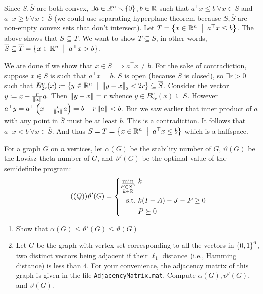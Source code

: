 Since $S,\overline S$ are both convex, $\exists a\in \mathbb{R}^{n}\smallsetminus\left\{0\right\}, b\in\mathbb{R}$ such that $a^{\top}x\le b~\forall x\in S$ and $a^{\top}x \ge b~\forall x\in \overline S$ (we could use separating hyperplane theorem because $S,\overline S$ are non-empty convex sets that don't intersect). Let $T = \set{x\in\R^{n}\st a^{\top}x \le b}$. The above shows that $S\subseteq T$. We want to show $T\subseteq S$, in other words, $\overline S \subseteq \overline T = \set{x\in\R^{n}\st a^{\top}x >b}$. 

We are done if we show that $x\in \overline S\implies a^{\top}x \ne b$. For the sake of contradiction, suppose $x\in \overline S$ is such that $a^{\top}x = b$. $\overline S$ is open (because $S$ is closed), so $\exists r>0$ such that $B^{o}_{2r}(x)\sett \set{y\in\R^{n}\st \norm{y-x}{2} < 2r}\subseteq \overline S$. Consider the vector $y \coloneqq x-\frac{r}{\left\lVert a \right\rVert_{}}a$. Then $\left\lVert y-x \right\rVert_{} = r$ whence $y\in B^{o}_{2r}(x)\subseteq \overline S$. However $a^{\top}y = a^{\top}\left(x-\frac{r}{\left\lVert a \right\rVert_{}}a\right) = b - r \left\lVert a \right\rVert_{} < b$. But we saw earlier that inner product of $a$ with any point in $\overline S$ must be at least $b$. This is a contradiction. It follows that $a^{\top}x< b~\forall x\in\overline S$. And thus $S = T = \set{x\in\R^{n}\st a^{\top}x\le b}$ which is a halfspace.



\newpage




\pb
For a graph $G$ on $n$ vertices, let $\alpha(G)$ be the stability number of $G$, $\vartheta(G)$ be the Lov\'asz theta number of $G$, and $\vartheta'(G)$ be the optimal value of the semidefinite program:
\begin{equation}\label{lovasz}\tag{$(Q)$}
\vartheta'(G) = \left\{
\begin{aligned}
\min_{\substack{P\in S^{n}\\k\in \mathbb{R}}}&~ k\\
\text{s.t.} &~ k(I+A)-J-P \ge 0\\
&~ P\succeq 0
\end{aligned}\right.
\end{equation}
\begin{enumerate}[leftmargin=*, label=(\alph*)]
\item Show that $\alpha(G)\le \vartheta'(G)\le \vartheta(G)$
\item Let $G$ be the graph with vertex set corresponding to all the vectors in $\left\{0,1\right\}^{6}$, two distinct vectors being adjacent if their $\ell_{1}$ distance (i.e., Hamming distance) is less than $4$. For your convenience, the adjacency matrix of this graph is given in the file \texttt{AdjacencyMatrix.mat}. Compute $\alpha(G),\vartheta'(G)$, and $\vartheta(G)$.
\end{enumerate}

